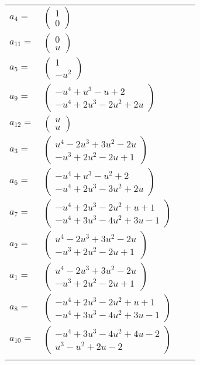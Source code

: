 \documentclass[1p]{elsarticle_modified}
\theoremstyle{definition}
\begin{document}
\begin{tabular}{m{7pt} m{180pt} m{7pt} m{180pt} }
\flushright $a_{4}=$&$\begin{pmatrix}1\\0\end{pmatrix}$ \\
\flushright $a_{11}=$&$\begin{pmatrix}0\\u\end{pmatrix}$ \\
\flushright $a_{5}=$&$\begin{pmatrix}1\\- u^2\end{pmatrix}$ \\
\flushright $a_{9}=$&$\begin{pmatrix}- u^4+u^3- u+2\\- u^4+2 u^3-2 u^2+2 u\end{pmatrix}$ \\
\flushright $a_{12}=$&$\begin{pmatrix}u\\u\end{pmatrix}$ \\
\flushright $a_{3}=$&$\begin{pmatrix}u^4-2 u^3+3 u^2-2 u\\- u^3+2 u^2-2 u+1\end{pmatrix}$ \\
\flushright $a_{6}=$&$\begin{pmatrix}- u^4+u^3- u^2+2\\- u^4+2 u^3-3 u^2+2 u\end{pmatrix}$ \\
\flushright $a_{7}=$&$\begin{pmatrix}- u^4+2 u^3-2 u^2+u+1\\- u^4+3 u^3-4 u^2+3 u-1\end{pmatrix}$ \\
\flushright $a_{2}=$&$\begin{pmatrix}u^4-2 u^3+3 u^2-2 u\\- u^3+2 u^2-2 u+1\end{pmatrix}$ \\
\flushright $a_{1}=$&$\begin{pmatrix}u^4-2 u^3+3 u^2-2 u\\- u^3+2 u^2-2 u+1\end{pmatrix}$ \\
\flushright $a_{8}=$&$\begin{pmatrix}- u^4+2 u^3-2 u^2+u+1\\- u^4+3 u^3-4 u^2+3 u-1\end{pmatrix}$ \\
\flushright $a_{10}=$&$\begin{pmatrix}- u^4+3 u^3-4 u^2+4 u-2\\u^3- u^2+2 u-2\end{pmatrix}$\\&\end{tabular}
\end{document}
